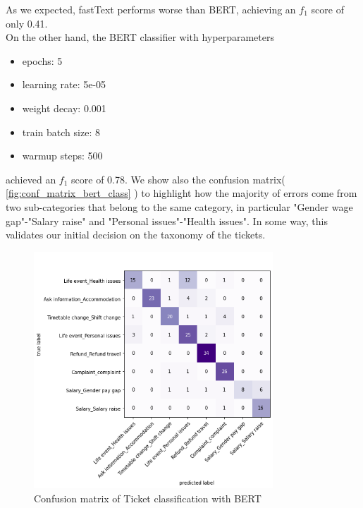 As we expected, fastText performs worse than BERT, achieving an $f_1$ score of only 0.41. \\
On the other hand, the BERT classifier with hyperparameters\begin{itemize}
  \item epochs: 5
  \item learning rate: 5e-05
  \item weight decay: 0.001
  \item train batch size: 8
  \item warmup steps: 500
\end{itemize}
achieved an $f_1$ score of 0.78. We show also the confusion matrix( \autoref{fig:conf_matrix_bert_class} ) to highlight how the majority of errors come from two sub-categories that belong to the same category, in particular "Gender wage gap"-"Salary raise" and "Personal issues"-"Health issues". In some way, this validates our initial decision on the taxonomy of the tickets.
\begin{figure}[h] 
  \centering
  \includegraphics[width=0.8\textwidth]{images/conf_matrix_bert_class.png}
  \caption{Confusion matrix of Ticket classification with BERT}
  \label{fig:conf_matrix_bert_class}
\end{figure}    
